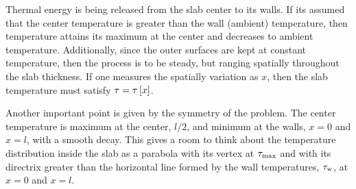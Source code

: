 \begin{guess}
Thermal energy is being released from the slab center to its walls. If its assumed that the center temperature is greater than the wall (ambient) temperature, then temperature attains its maximum at the center and decreases to ambient temperature. Additionally, since the outer surfaces are kept at constant temperature, then the process is to be steady, but ranging spatially throughout the slab thickness. If one measures the spatially variation as $x$, then the slab temperature must satisfy $\tau = \tau\left[{x}\right]$.

Another important point is given by the symmetry of the problem. The center temperature is maximum at the center, $l/2$, and minimum at the walls, $x = 0$ and $x = l$, with a smooth decay. This gives a room to think about the temperature distribution inside the slab as a parabola with its vertex at $\tau_\text{max}$ and with its directrix greater than the horizontal line formed by the wall temperatures, $\tau_\text{w}$, at $x = 0$ and $x = l$.
\end{guess}

